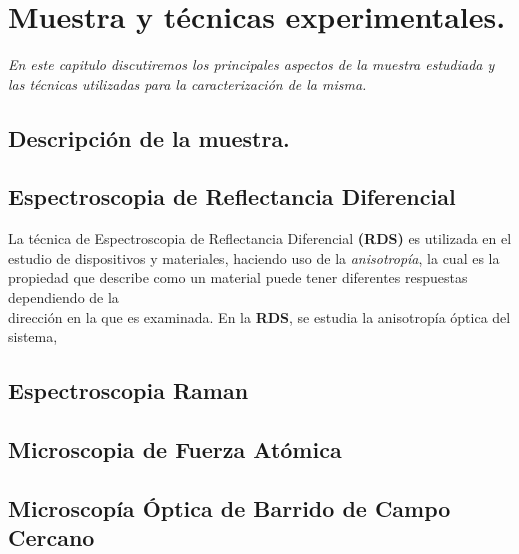 \chapter{Muestra y técnicas experimentales.}
\label{chap:techniques-and-sample}
\textit{En este capitulo discutiremos los principales aspectos de la muestra estudiada y las técnicas utilizadas para la caracterización de la misma.}
\vfill
\minitoc
\newpage

\section{Descripción de la muestra.}
\label{sec:chap3-sample-description}
\newpage

\section{Espectroscopia de Reflectancia Diferencial}
\label{sec:chap3-rds}
La técnica de Espectroscopia de Reflectancia Diferencial \textbf{(RDS)} es
utilizada en el estudio de dispositivos y materiales, haciendo uso de la
\textit{anisotropía}, la cual es la propiedad que describe como un material
puede tener diferentes respuestas dependiendo de la 
\\dirección en la que es examinada. En la \textbf{RDS}, se estudia la anisotropía
óptica del sistema, 

\newpage

\section{Espectroscopia Raman}
\label{sec:chap3-raman}
\newpage

\section{Microscopia de Fuerza Atómica}
\label{sec:chap3-afm}
\newpage

\section{Microscopía Óptica de Barrido de Campo Cercano}
\label{sec:chap3-nsom}
\newpage